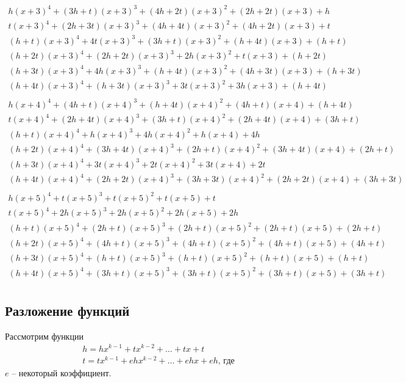 \documentclass[bibliography=totoc, a4paper, 12pt]{extarticle}
\begin{document}
$$\begin{array}{l}
h(x+3)^4 + (3h + t)(x+3)^3 + (4h + 2t)(x+3)^2 + (2h + 2t)(x+3) + h\\
t(x+3)^4 + (2h + 3t)(x+3)^3 + (4h + 4t)(x+3)^2 + (4h + 2t)(x+3) + t\\
(h + t)(x+3)^4 + 4t(x+3)^3 + (3h + t)(x+3)^2 + (h + 4t)(x+3) + (h + t)\\
(h + 2t)(x+3)^4 + (2h + 2t)(x+3)^3 + 2h(x+3)^2 + t(x+3) + (h + 2t)\\
(h + 3t)(x+3)^4 + 4h(x+3)^3 + (h + 4t)(x+3)^2 + (4h + 3t)(x+3) + (h + 3t)\\
(h + 4t)(x+3)^4 + (h + 3t)(x+3)^3 + 3t(x+3)^2 + 3h(x+3) + (h + 4t)\\
\end{array}$$
$$\begin{array}{l}
h(x+4)^4 + (4h + t)(x+4)^3 + (h + 4t)(x+4)^2 + (4h + t)(x+4) + (h + 4t)\\
t(x+4)^4 + (2h + 4t)(x+4)^3 + (3h + t)(x+4)^2 + (2h + 4t)(x+4) + (3h + t)\\
(h + t)(x+4)^4 + h(x+4)^3 + 4h(x+4)^2 + h(x+4) + 4h\\
(h + 2t)(x+4)^4 + (3h + 4t)(x+4)^3 + (2h + t)(x+4)^2 + (3h + 4t)(x+4) +
(2h + t)\\
(h + 3t)(x+4)^4 + 3t(x+4)^3 + 2t(x+4)^2 + 3t(x+4) + 2t\\
(h + 4t)(x+4)^4 + (2h + 2t)(x+4)^3 + (3h + 3t)(x+4)^2 + (2h + 2t)(x+4) +
(3h + 3t)\\
\end{array}$$
$$\begin{array}{l}
h(x+5)^4 + t(x+5)^3 + t(x+5)^2 + t(x+5) + t\\
t(x+5)^4 + 2h(x+5)^3 + 2h(x+5)^2 + 2h(x+5) + 2h\\
(h + t)(x+5)^4 + (2h + t)(x+5)^3 + (2h + t)(x+5)^2 + (2h + t)(x+5) + (2h + t)\\
(h + 2t)(x+5)^4 + (4h + t)(x+5)^3 + (4h + t)(x+5)^2 + (4h + t)(x+5) + (4h + t)\\
(h + 3t)(x+5)^4 + (h + t)(x+5)^3 + (h + t)(x+5)^2 + (h + t)(x+5) + (h + t)\\
(h + 4t)(x+5)^4 + (3h + t)(x+5)^3 + (3h + t)(x+5)^2 + (3h + t)(x+5) + (3h + t)\\
\end{array}$$

\subsection{Разложение функций}
Рассмотрим функции
\[ \begin{array}{l}
    h = hx^{k-1} + tx^{k-2} + \dots + tx + t \\
    t = tx^{k-1} + ehx^{k-2} + \dots + ehx + eh \text{, где}
\end{array} \]
$e$ -- некоторый коэффициент.
\end{document}
